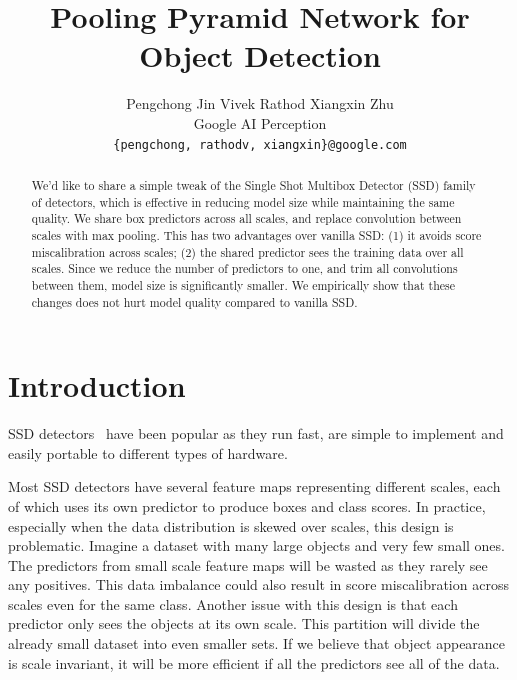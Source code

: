 \documentclass[10pt,twocolumn,letterpaper]{article}
\begin{document}
\title{Pooling Pyramid Network for Object Detection}

\author{
Pengchong Jin
\hspace*{32pt}
Vivek Rathod
\hspace*{32pt}
Xiangxin Zhu
\\
Google AI Perception\\
{\tt\small \{pengchong, rathodv, xiangxin\}@google.com}
}


\maketitle

\begin{abstract}
  We'd like to share a simple tweak of the Single Shot Multibox Detector
  (SSD) family of detectors,
  which is effective in reducing model size while
  maintaining the same quality. We share box predictors
  across all scales, and replace convolution between
  scales with max pooling. This has two advantages over vanilla
  SSD: (1) it avoids score miscalibration across scales; (2)
  the shared predictor sees the training data over all
  scales. Since we reduce the number of predictors to one, and
  trim all convolutions between them, model size is
  significantly smaller. We empirically show that these changes
  does not hurt model quality compared to vanilla SSD.

\end{abstract}

\section{Introduction}
SSD detectors~\cite{liu2016ssd,lin2017focal} have
been popular as they run fast, are simple to implement
and easily portable to different types of hardware.


Most SSD detectors have several feature maps
representing different scales, each of which uses its own
predictor to produce boxes and class scores.
In practice, especially when the data distribution is skewed
over scales, this design is problematic. Imagine a
dataset with many large objects and very few small ones.
The predictors from small scale feature maps will be
wasted as they rarely see any positives. This data imbalance
could also result in score miscalibration across scales even
for the same class. Another issue with this design is that
each predictor only sees the objects at its own scale. This
partition will divide the already small dataset
into even smaller sets. If we believe that object
appearance is scale invariant, it will be more efficient
if all the predictors see all of the data.
\end{document}
